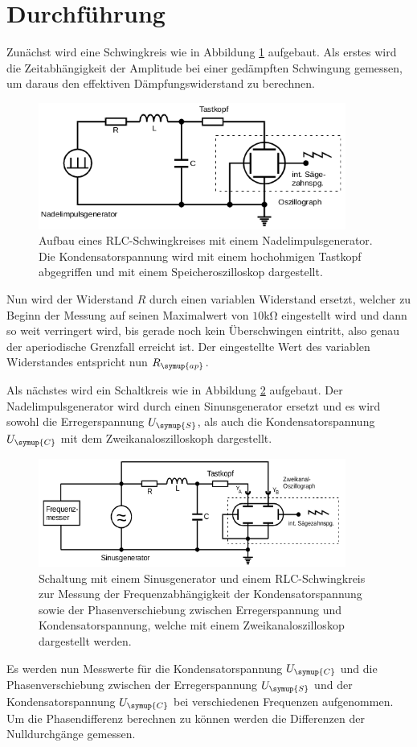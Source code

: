 \section{Durchführung}
\label{sec:Durchführung}
Zunächst wird eine Schwingkreis wie in Abbildung \ref{fig:aufbau1} aufgebaut.
Als erstes wird die Zeitabhängigkeit der Amplitude bei einer gedämpften Schwingung
gemessen, um daraus den effektiven Dämpfungswiderstand zu berechnen.
\begin{figure}
  \centering
  \includegraphics[width=0.9\textwidth]{aufbau1.png}
  \caption{Aufbau eines RLC-Schwingkreises mit einem Nadelimpulsgenerator. Die
  Kondensatorspannung wird mit einem hochohmigen Tastkopf abgegriffen und mit
  einem Speicheroszilloskop dargestellt\cite{sample}.}
  \label{fig:aufbau1}
\end{figure}
Nun wird der Widerstand $R$ durch einen variablen Widerstand ersetzt, welcher zu
Beginn der Messung auf seinen Maximalwert von $10 \si{\kilo\ohm}$ eingestellt wird
und dann so weit verringert wird, bis gerade noch kein Überschwingen eintritt,
also genau der aperiodische Grenzfall erreicht ist. Der eingestellte Wert des
variablen Widerstandes entspricht nun $R_\symup{ap}$.

Als nächstes wird ein Schaltkreis wie in Abbildung \ref{fig:aufbau2} aufgebaut.
Der Nadelimpulsgenerator wird durch einen Sinunsgenerator ersetzt und es wird
sowohl die Erregerspannung $U_\symup{S}$, als auch die Kondensatorspannung
$U_\symup{C}$ mit dem Zweikanaloszilloskoph dargestellt.
\begin{figure}
  \centering
  \includegraphics[width=0.9\textwidth]{aufbau2.png}
  \caption{Schaltung mit einem Sinusgenerator und einem RLC-Schwingkreis zur
  Messung der Frequenzabhängigkeit der Kondensatorspannung sowie der
  Phasenverschiebung zwischen Erregerspannung und Kondensatorspannung, welche mit
  einem Zweikanaloszilloskop dargestellt werden\cite{sample}.}
  \label{fig:aufbau2}
\end{figure}
Es werden nun Messwerte für die Kondensatorspannung $U_\symup{C}$ und die
Phasenverschiebung zwischen der Erregerspannung $U_\symup{S}$ und der
Kondensatorspannung $U_\symup{C}$ bei verschiedenen Frequenzen aufgenommen. Um
die Phasendifferenz berechnen zu können werden die Differenzen der Nulldurchgänge
gemessen.

